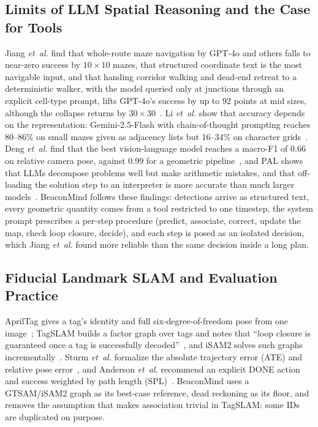 \documentclass[conference]{IEEEtran}
\begin{document}
\subsection{Limits of LLM Spatial Reasoning and the Case for Tools}
Jiang \textit{et~al.} find that whole-route maze navigation by GPT-4o and others falls to near-zero success by
$10\times10$ mazes, that structured coordinate text is the most navigable input, and that handing corridor
walking and dead-end retreat to a deterministic walker, with the model queried only at junctions through an
explicit cell-type prompt, lifts GPT-4o's success by up to 92 points at mid sizes, although the collapse returns by
$30\times30$~\cite{jiang2026lost}. Li \textit{et~al.} show that accuracy depends on the representation:
Gemini-2.5-Flash with chain-of-thought prompting reaches 80--86\% on small mazes given as adjacency lists but
16--34\% on character grids~\cite{li2026llms}. Deng \textit{et~al.} find that the best vision-language
model reaches a macro-F1 of 0.66 on relative camera pose, against 0.99 for a geometric pipeline~\cite{deng2026lost},
and PAL shows that LLMs decompose problems well but make arithmetic mistakes, and that off-loading the solution
step to an interpreter is more accurate than much larger models~\cite{gao2023pal}. BeaconMind follows these
findings: detections arrive as structured text, every geometric quantity comes from a tool restricted to one
timestep, the system prompt prescribes a per-step procedure (predict, associate, correct, update the map, check
loop closure, decide), and each step is posed as an isolated decision, which Jiang \textit{et~al.} found more
reliable than the same decision inside a long plan.

\subsection{Fiducial Landmark SLAM and Evaluation Practice}
AprilTag gives a tag's identity and full six-degree-of-freedom pose from one image~\cite{olson2011apriltag}; TagSLAM builds a factor
graph over tags and notes that ``loop closure is guaranteed once a tag is successfully
decoded''~\cite{pfrommer2019tagslam}, and iSAM2 solves such graphs incrementally~\cite{kaess2012isam2}. Sturm
\textit{et~al.} formalize the absolute trajectory error (ATE) and relative pose error~\cite{sturm2012benchmark},
and Anderson \textit{et~al.} recommend an explicit DONE action and success weighted by path length
(SPL)~\cite{anderson2018evaluation}. BeaconMind uses a GTSAM/iSAM2 graph as its best-case reference, dead
reckoning as its floor, and removes the assumption that makes association trivial in TagSLAM: some IDs are
duplicated on purpose.
\end{document}

